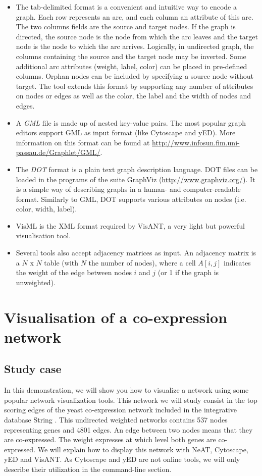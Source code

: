 \begin{itemize}
\item The tab-delimited format is a convenient and intuitive way to encode a graph. Each row represents an arc, and each column an attribute of this arc. The two columns fields are the source and target nodes. If the graph is directed, the source node is the node from which the arc leaves and the target node is the node to which the arc arrives. Logically, in undirected graph, the columns containing the source and the target node may be inverted. Some additional arc attributes (weight, label, color) can be placed in pre-defined columns. Orphan nodes can be included by specifying a source node without target. The tool  extends this format by supporting any number of attributes on nodes or edges as well as the color, the label and the width of nodes and edges. 
\item A \textit{GML} file is made up of nested key-value pairs. The most popular graph editors support GML as input format (like Cytoscape and yED). More information on this format can be found at \url{http://www.infosun.fim.uni-passau.de/Graphlet/GML/}.
\item The \textit{DOT} format is a plain text graph description language. DOT files can be loaded in the programs of the suite GraphViz (\url{http://www.graphviz.org/}). It is a simple way of describing graphs in a human- and computer-readable format. Similarly to GML, DOT supports various attributes on nodes (i.e. color, width, label). 
\item VisML is the XML format required by VisANT, a very light but powerful visualisation tool.
\item Several tools also accept adjacency matrices as input. An adjacency matrix is a $N$ x $N$ table (with $N$ the number of nodes), where a cell $A[i,j]$ indicates the weight of the edge between nodes $i$ and $j$ (or 1 if the graph is unweighted).
\end{itemize}


\section{Visualisation of a co-expression network}
\subsection{Study case}

In this demonstration, we will show you how to visualize a network using some popular network visualization tools.
This network we will study consist in the top scoring edges of the yeast co-expression network included in the integrative database String \cite{Mering2007}. This undirected weighted networks contains 537 nodes representing genes and 4801 edges. An edge between two nodes means that they are co-expressed. The weight expresses at which level both genes are co-expressed. We will explain how to display this network with NeAT, Cytoscape, yED and VisANT. As Cytoscape and yED are not online tools, we will only describe their utilization in the command-line section.


